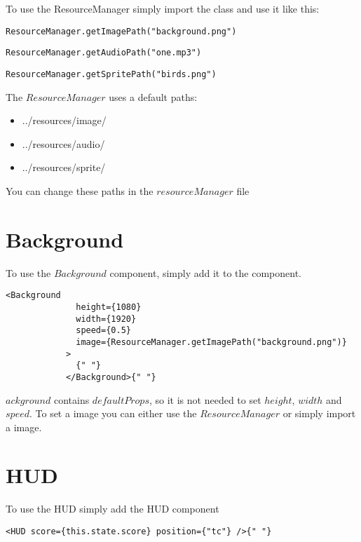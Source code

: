 To use the ResourceManager simply import the class and use it like this:

\begin{lstlisting}
ResourceManager.getImagePath("background.png")
\end{lstlisting}

\begin{lstlisting}
ResourceManager.getAudioPath("one.mp3")
\end{lstlisting}

\begin{lstlisting}
ResourceManager.getSpritePath("birds.png")
\end{lstlisting}

The $ResourceManager$ uses a default paths:

\begin{itemize}
	\item ../resources/image/
    \item ../resources/audio/
    \item ../resources/sprite/
\end{itemize}

You can change these paths in the $resourceManager$ file

\section{Background}

To use the $Background$ component, simply add it to the component.

\begin{lstlisting}
<Background
              height={1080}
              width={1920}
              speed={0.5}
              image={ResourceManager.getImagePath("background.png")}
            >
              {" "}
            </Background>{" "}
\end{lstlisting}

$ackground$ contains $defaultProps$, so it is not needed to set $height$, $width$ and $speed$. To set a image you can either use the $ResourceManager$ or simply import a image.

\section{HUD}
To use the HUD simply add the HUD component
\begin{lstlisting}
<HUD score={this.state.score} position={"tc"} />{" "}
\end{lstlisting}

